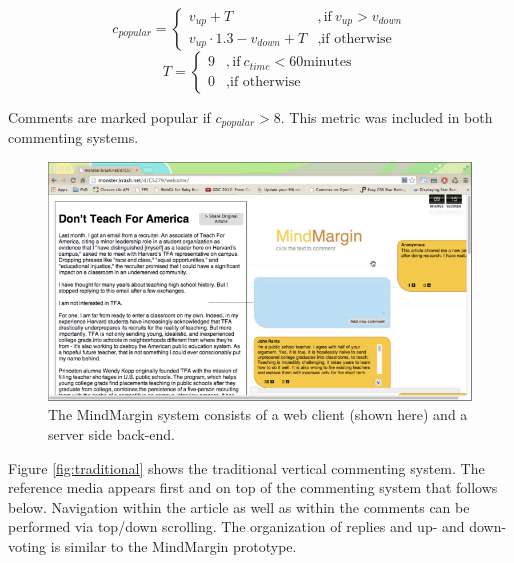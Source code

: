 \begin{displaymath}
   c_{popular} = 
     \begin{cases}
     v_{up} + T &, \text{if}~v_{up} > v_{down}\\
     v_{up} \cdot 1.3 - v_{down} + T &, \text{if otherwise}
	\end{cases}
\end{displaymath} 
\begin{displaymath}	
	T = 
		\begin{cases}
		9 &, \text{if}~c_{time} < 60 \text{minutes}\\
		0 &, \text{if otherwise}
		\end{cases}
\end{displaymath} 

Comments are marked popular if $c_{popular} > 8$. This metric was included in both commenting systems.   
   
\begin{figure}
\centering
\includegraphics[scale=0.3]{mindmargin.png} 
\caption{The MindMargin system consists of a web client (shown here) and a server side back-end.}
\label{fig:frontend}
\end{figure}

Figure \ref{fig:traditional} shows the traditional vertical commenting system. The reference media appears first and on top of the commenting system that follows below. Navigation within the article as well as within the comments can be performed via top/down scrolling. The organization of replies and up- and down-voting is similar to the MindMargin prototype.


